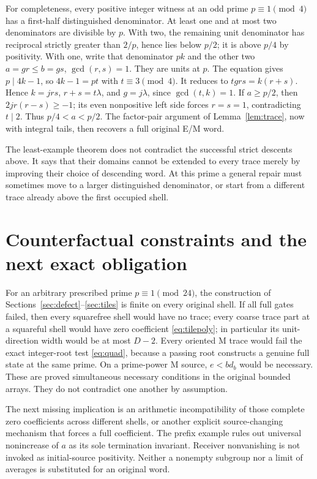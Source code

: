 For completeness, every positive integer witness at an odd prime
$p\equiv1\pmod4$ has a first-half distinguished denominator. At least one
and at most two denominators are divisible by $p$. With two, the remaining
unit denominator has reciprocal strictly greater than $2/p$, hence lies below
$p/2$; it is above $p/4$ by positivity. With one, write that denominator $pk$
and the other two $a=gr\le b=gs$, $\gcd(r,s)=1$. They are units at $p$.
The equation gives $p\mid4k-1$, so $4k-1=pt$ with $t\equiv3\pmod4$.
It reduces to $tgrs=k(r+s)$. Hence $k=jrs$, $r+s=t\lambda$, and
$g=j\lambda$, since $\gcd(t,k)=1$.
If $a\ge p/2$, then $2jr(r-s)\ge-1$; its even nonpositive left side forces
$r=s=1$, contradicting $t\mid2$. Thus $p/4<a<p/2$.
The factor-pair argument of Lemma~\ref{lem:trace}, now with integral tails,
then recovers a full original E/M word.

The least-example theorem does not contradict the successful strict descents
above. It says that their domains cannot be extended to every trace merely
by improving their choice of descending word. At this prime a general repair
must sometimes move to a larger distinguished denominator, or start from a
different trace already above the first occupied shell.

\section{Counterfactual constraints and the next exact obligation}
For an arbitrary prescribed prime $p\equiv1\pmod{24}$, the construction of
Sections~\ref{sec:defect}--\ref{sec:tiles} is finite on every original shell.
If all full gates failed, then every squarefree shell would have no trace;
every coarse trace part at a squareful shell would have zero coefficient
\eqref{eq:tilepoly}; in particular its unit-direction width would be at most
$D-2$. Every oriented M trace would fail the exact integer-root test
\eqref{eq:quad}, because a passing root constructs a genuine full state at
the same prime. On a prime-power M source, $e<bd_b$ would be necessary.
These are proved simultaneous necessary conditions in the original bounded
arrays. They do not contradict one another by assumption.

The next missing implication is an arithmetic incompatibility of those
complete zero coefficients across different shells, or another explicit
source-changing mechanism that forces a full coefficient. The prefix example
rules out universal nonincrease of $a$ as its sole termination invariant.
Receiver nonvanishing is not invoked as initial-source positivity. Neither a
nonempty subgroup nor a limit of averages is substituted for an original word.

